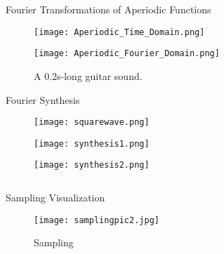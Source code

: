 \documentclass[leqno,presentation]{beamer}
\theoremstyle{definition}
\begin{document}
\begin{frame}
\begin{columns}[t]
\begin{column}{.45\linewidth}
\begin{block}{Fourier Transformations of Aperiodic Functions}
\begin{figure}[p]
    \centering
	\begin{minipage}{.33 \textwidth}
    \centering
    \texttt{[image: Aperiodic\_Time\_Domain.png]}
    \caption{A 0.2s-long guitar sound.}
    \label{tf1}
	\end{minipage}%
    \begin{minipage}{.33 \textwidth}
    \centering
    \texttt{[image: Aperiodic\_Fourier\_Domain.png]}
    \label{tf2}
	\end{minipage}
\end{figure}
\end{block}
\begin{block}{Fourier Synthesis}

\begin{figure}[p]
    \centering
	\begin{minipage}{.25 \textwidth}
    \centering
    \texttt{[image: squarewave.png]}
    \label{1}
	\end{minipage}%
	\begin{minipage}{.5 \textwidth}
    \centering
    \texttt{[image: synthesis1.png]}
    \label{2}
	\end{minipage}%
    \begin{minipage}{.25 \textwidth}
    \centering
    \texttt{[image: synthesis2.png]}
    \label{3}
	\end{minipage}%
\end{figure}

\end{block}

\begin{columns}
\begin{column}{.49\linewidth}
\begin{block}{Sampling Visualization}

\begin{figure}
    \centering
   	\texttt{[image: samplingpic2.jpg]}
    \caption{Sampling}
    \label{sampling}
\end {figure}

\end{block}
\end{column}


\end{columns}
\end{column}
\end{columns}
\end{frame}
\end{document}

